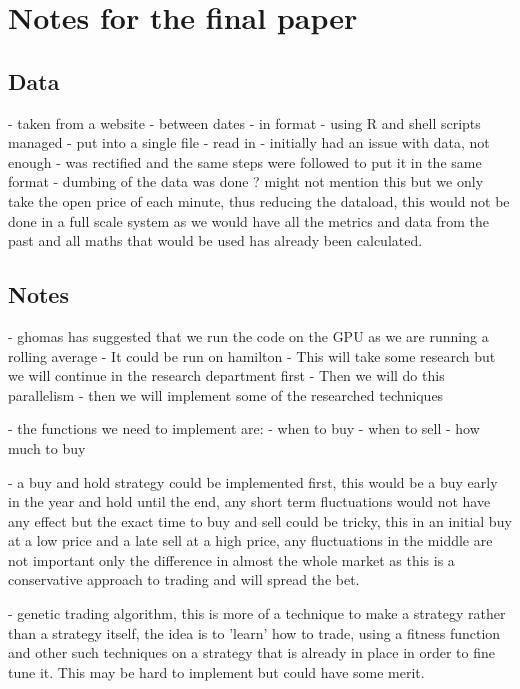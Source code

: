\documentclass[12pt,a4paper]{article}
\begin{document}
\iffalse
#################################################################################
\fi

\section*{Notes for the final paper}

\subsection*{Data}
- taken from a website
- between dates
- in format
- using R and shell scripts managed
- put into a single file
- read in
- initially had an issue with data, not enough
- was rectified and the same steps were followed to put it in the same format
- dumbing of the data was done ? might not mention this but we only take the open price of each minute, thus reducing the dataload, this would not be done in a full scale system as we would have all the metrics and data from the past and all maths that would be used has already been calculated.

\subsection*{Notes}
- ghomas has suggested that we run the code on the GPU as we are running a rolling average
- It could be run on hamilton
- This will take some research but we will continue in the research department first
- Then we will do this parallelism
- then we will implement some of the researched techniques

- the functions we need to implement are:
- when to buy
- when to sell
- how much to buy

- a buy and hold strategy could be implemented first, this would be a buy early in the year and hold until the end, any short term fluctuations would not have any effect but the exact time to buy and sell could be tricky, this in an initial buy at a low price and a late sell at a high price, any fluctuations in the middle are not important only the difference in almost the whole market as this is a conservative approach to trading and will spread the bet.

- genetic trading algorithm, this is more of a technique to make a strategy rather than a strategy itself, the idea is to 'learn' how to trade, using a fitness function and other such techniques on a strategy that is already in place in order to fine tune it. This may be hard to implement but could have some merit.
\end{document}
